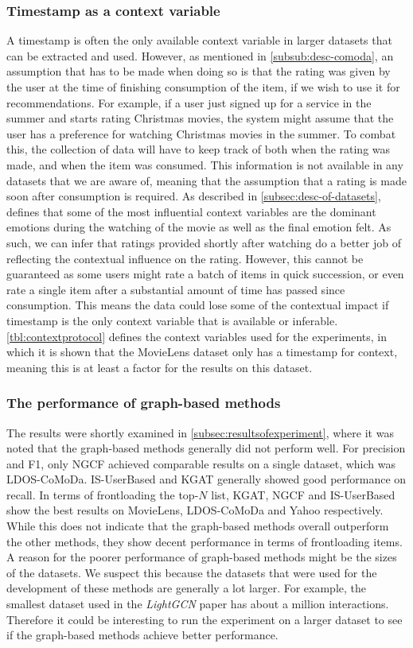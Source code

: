 \subsubsection{Timestamp as a context variable}
A timestamp is often the only available context variable in larger datasets that can be extracted and used.
However, as mentioned in \autoref{subsub:desc-comoda}, an assumption that has to be made when doing so is that the rating was given by the user at the time of finishing consumption of the item, if we wish to use it for recommendations.
For example, if a user just signed up for a service in the summer and starts rating Christmas movies, the system might assume that the user has a preference for watching Christmas movies in the summer.
To combat this, the collection of data will have to keep track of both when the rating was made, and when the item was consumed.
This information is not available in any datasets that we are aware of, meaning that the assumption that a rating is made soon after consumption is required.
As described in \autoref{subsec:desc-of-datasets}, \cite{COMODA2013} defines that some of the most influential context variables are the dominant emotions during the watching of the movie as well as the final emotion felt.
As such, we can infer that ratings provided shortly after watching do a better job of reflecting the contextual influence on the rating.
However, this cannot be guaranteed as some users might rate a batch of items in quick succession, or even rate a single item after a substantial amount of time has passed since consumption.
This means the data could lose some of the contextual impact if timestamp is the only context variable that is available or inferable.
\autoref{tbl:contextprotocol} defines the context variables used for the experiments, in which it is shown that the MovieLens dataset only has a timestamp for context, meaning this is at least a factor for the results on this dataset. 

\subsubsection{The performance of graph-based methods} 
The results were shortly examined in \autoref{subsec:resultsofexperiment}, where it was noted that the graph-based methods generally did not perform well.
For precision and F1, only NGCF achieved comparable results on a single dataset, which was LDOS-CoMoDa.
IS-UserBased and KGAT generally showed good performance on recall.
In terms of frontloading the top-$N$ list, KGAT, NGCF and IS-UserBased show the best results on MovieLens, LDOS-CoMoDa and Yahoo respectively.
While this does not indicate that the graph-based methods overall outperform the other methods, they show decent performance in terms of frontloading items.
A reason for the poorer performance of graph-based methods might be the sizes of the datasets.
We suspect this because the datasets that were used for the development of these methods are generally a lot larger.
For example, the smallest dataset used in the \textit{LightGCN}\cite{LightGCN} paper has about a million interactions.
Therefore it could be interesting to run the experiment on a larger dataset to see if the graph-based methods achieve better performance.
